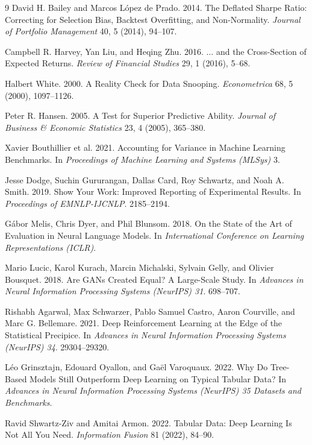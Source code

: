 \documentclass[sigconf,review,anonymous]{acmart}
\begin{document}
\begin{thebibliography}{9}
David H. Bailey and Marcos L\'opez de Prado. 2014. The Deflated Sharpe Ratio: Correcting for Selection Bias, Backtest Overfitting, and Non-Normality. \textit{Journal of Portfolio Management} 40, 5 (2014), 94--107.

Campbell R. Harvey, Yan Liu, and Heqing Zhu. 2016. $\ldots$ and the Cross-Section of Expected Returns. \textit{Review of Financial Studies} 29, 1 (2016), 5--68.

Halbert White. 2000. A Reality Check for Data Snooping. \textit{Econometrica} 68, 5 (2000), 1097--1126.

Peter R. Hansen. 2005. A Test for Superior Predictive Ability. \textit{Journal of Business \& Economic Statistics} 23, 4 (2005), 365--380.

Xavier Bouthillier et al. 2021. Accounting for Variance in Machine Learning Benchmarks. In \textit{Proceedings of Machine Learning and Systems (MLSys)} 3.

Jesse Dodge, Suchin Gururangan, Dallas Card, Roy Schwartz, and Noah A. Smith. 2019. Show Your Work: Improved Reporting of Experimental Results. In \textit{Proceedings of EMNLP-IJCNLP}. 2185--2194.

G\'abor Melis, Chris Dyer, and Phil Blunsom. 2018. On the State of the Art of Evaluation in Neural Language Models. In \textit{International Conference on Learning Representations (ICLR)}.

Mario Lucic, Karol Kurach, Marcin Michalski, Sylvain Gelly, and Olivier Bousquet. 2018. Are GANs Created Equal? A Large-Scale Study. In \textit{Advances in Neural Information Processing Systems (NeurIPS) 31}. 698--707.

Rishabh Agarwal, Max Schwarzer, Pablo Samuel Castro, Aaron Courville, and Marc G. Bellemare. 2021. Deep Reinforcement Learning at the Edge of the Statistical Precipice. In \textit{Advances in Neural Information Processing Systems (NeurIPS) 34}. 29304--29320.

L\'eo Grinsztajn, Edouard Oyallon, and Ga\"el Varoquaux. 2022. Why Do Tree-Based Models Still Outperform Deep Learning on Typical Tabular Data? In \textit{Advances in Neural Information Processing Systems (NeurIPS) 35 Datasets and Benchmarks}.

Ravid Shwartz-Ziv and Amitai Armon. 2022. Tabular Data: Deep Learning Is Not All You Need. \textit{Information Fusion} 81 (2022), 84--90.


\end{thebibliography}
\end{document}
